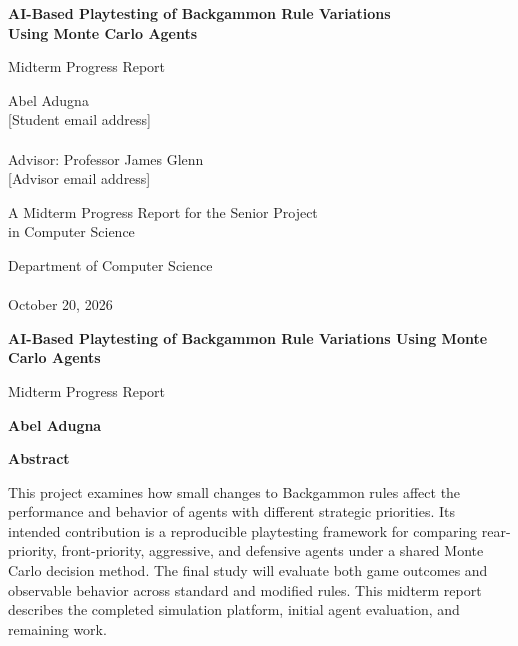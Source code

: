 \documentclass[12pt,twoside]{article}
\begin{document}
\begin{titlepage}
    \begin{center}
        \vspace*{1cm}

        \huge
        \textbf{AI-Based Playtesting of Backgammon Rule Variations \\
        Using Monte Carlo Agents}

        \vspace{0.5cm}
        \LARGE
        Midterm Progress Report

        \vspace{1cm}

        \Large
        Abel Adugna\\
        [Student email address]\\~\\
        Advisor: Professor James Glenn\\
        [Advisor email address]

        \vfill

        A Midterm Progress Report for the Senior Project
        \\in Computer Science

        \vspace{0.8cm}

        \Large
        Department of Computer Science\\
        [University Name]\\
        October 20, 2026
    \end{center}
\end{titlepage}

\clearpage
\thispagestyle{plain}
\begin{center}
    \Large
    \textbf{AI-Based Playtesting of Backgammon Rule Variations Using Monte Carlo Agents}

    \vspace{0.4cm}
    \large
    Midterm Progress Report

    \vspace{0.4cm}
    \textbf{Abel Adugna}

    \vspace{0.9cm}
    \textbf{Abstract}
\end{center}

This project examines how small changes to Backgammon rules affect the performance and behavior of agents with different strategic priorities. Its intended contribution is a reproducible playtesting framework for comparing rear-priority, front-priority, aggressive, and defensive agents under a shared Monte Carlo decision method. The final study will evaluate both game outcomes and observable behavior across standard and modified rules. This midterm report describes the completed simulation platform, initial agent evaluation, and remaining work.
\end{document}
